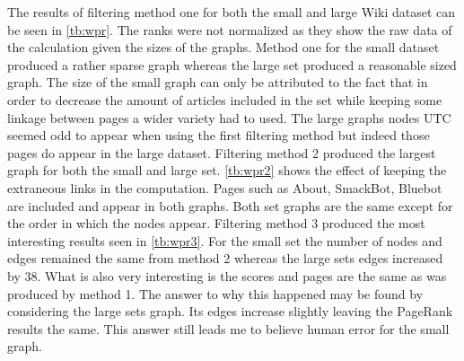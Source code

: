 \documentclass[11pt]{article}
\begin{document}
\noindent The results of filtering method one for both the small and large Wiki dataset can be seen in \autoref{tb:wpr}. The ranks were not normalized as they show the raw data of the calculation given the sizes of the graphs. Method one for the small dataset produced a rather sparse graph whereas the large set produced a reasonable sized graph. The size of the small graph can only be attributed to the fact that in order to decrease the amount of articles included in the set while keeping some linkage between pages a wider variety had to used. The large graphs nodes UTC seemed odd to appear when using the first filtering method but indeed those pages do appear in the large dataset.\newline \newline \noindent
Filtering method 2 produced the largest graph for both the small and large set. \autoref{tb:wpr2}
shows the effect of keeping the extraneous links in the computation. Pages such as About, SmackBot, Bluebot are included and appear in both graphs. Both set graphs are the same except for the order in which the nodes appear.\newline \newline \noindent
Filtering method 3 produced the most interesting results seen in \autoref{tb:wpr3}. For the small set the number of nodes and edges remained the same from method 2 whereas the large sets edges increased by 38. What is also very interesting is the scores and pages are the same as was produced by method 1. The answer to why this happened may be found by considering the large sets graph. Its edges increase slightly leaving the PageRank results the same. This answer still leads me to believe human error for the small graph. 
\end{document}
